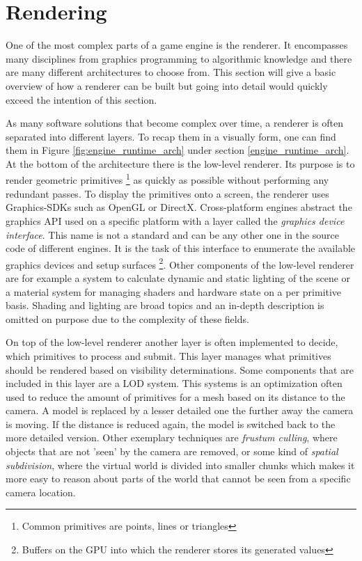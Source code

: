 \section{Rendering}

One of the most complex parts of a game engine is the renderer. It encompasses many disciplines from graphics programming to algorithmic knowledge and there are many different architectures to choose from. This section will give a basic overview of how a renderer can be built but going into detail would quickly exceed the intention of this section. 

As many software solutions that become complex over time, a renderer is often separated into different layers. To recap them in a visually form, one can find them in Figure \ref{fig:engine_runtime_arch} under section \ref{engine_runtime_arch}. At the bottom of the architecture there is the low-level renderer. Its purpose is to render geometric primitives \footnote{Common primitives are points, lines or triangles} as quickly as possible without performing any redundant passes. To display the primitives onto a screen, the renderer uses Graphics-\acp{SDK} such as OpenGL or DirectX. Cross-platform engines abstract the graphics \ac{API} used on a specific platform with a layer called the \textit{graphics device interface}. This name is not a standard and can be any other one in the source code of different engines. It is the task of this interface to enumerate the available graphics devices and setup surfaces \footnote{Buffers on the \ac{GPU} into which the renderer stores its generated values}. Other components of the low-level renderer are for example a system to calculate dynamic and static lighting of the scene or a material system for managing shaders and hardware state on a per primitive basis. Shading and lighting are broad topics and an in-depth description is omitted on purpose due to the complexity of these fields. 

On top of the low-level renderer another layer is often implemented to decide, which primitives to process and submit. This layer manages what primitives should be rendered based on visibility determinations. Some components that are included in this layer are a \ac{LOD} system. This systems is an optimization often used to reduce the amount of primitives for a mesh based on its distance to the camera. A model is replaced by a lesser detailed one the further away the camera is moving. If the distance is reduced again, the model is switched back to the more detailed version. Other exemplary techniques are \textit{frustum culling}, where objects that are not 'seen' by the camera are removed, or some kind of \textit{spatial subdivision}, where the virtual world is divided into smaller chunks which makes it more easy to reason about parts of the world that cannot be seen from a specific camera location.

